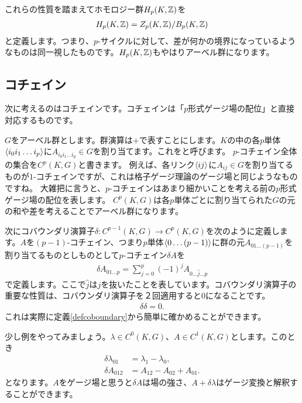 \documentclass[generalized_symmetry.tex]{subfiles}
\begin{document}
これらの性質を踏まえてホモロジー群$H_p(K,\mathbb{Z})$を
\begin{align}
    H_p(K,\mathbb{Z}) = Z_p(K,\mathbb{Z})/B_p(K,\mathbb{Z})
\end{align}
と定義します。つまり、$p$-サイクルに対して、差が何かの境界になっているようなものは同一視したものです。$H_p(K,\mathbb{Z})$もやはりアーベル群になります。

\subsection{コチェイン}

次に考えるのはコチェインです。コチェインは「$p$形式ゲージ場の配位」と直接対応するものです。

$G$をアーベル群とします。群演算は$+$で表すことにします。$K$の中の各$p$単体$\expval{i_0i_1\dots i_p}$に$A_{i_0i_1\dots i_p}\in G$を割り当てます。これをと呼びます。
$p$-コチェイン全体の集合を$C^p(K,G)$と書きます。
例えば、各リンク$\expval{ij}$に$A_{ij}\in G$を割り当てるものが$1$-コチェインですが、これは格子ゲージ理論のゲージ場と同じようなものですね。
大雑把に言うと、$p$-コチェインはあまり細かいことを考える前の$p$形式ゲージ場の配位を表します。
$C^p(K,G)$は各$p$単体ごとに割り当てられた$G$の元の和や差を考えることでアーベル群になります。

次にコバウンダリ演算子$\delta:C^{p-1}(K,G)\to C^{p}(K,G)$を次のように定義します。$A$を$(p-1)$-コチェイン、つまり$p$単体$\expval{0\dots(p-1)}$に群の元$A_{01\dots (p-1)}$を割り当てるものとしものとして$p$-コチェイン$\delta A$を
\begin{align}
    \delta A_{01\dots p} = \sum_{j=0}^{p} (-1)^{j} A_{0\dots \hat{j} \dots p}
    \label{defcoboundary}
\end{align}
で定義します。ここで$\hat{j}$は$j$を抜いたことを表しています。コバウンダリ演算子の重要な性質は、コバウンダリ演算子を２回適用すると$0$になることです。
\begin{align}
    \delta \delta = 0.
\end{align}
これは実際に定義\eqref{defcoboundary}から簡単に確かめることができます。

少し例をやってみましょう。$\lambda \in C^0(K,G)$、$A \in C^1(K,G)$とします。このとき
\begin{align}
    \delta \lambda_{01} &= \lambda_{1}-\lambda_{0},\\
    \delta A_{012} & = A_{12} - A_{02} + A_{01}.
\end{align}
となります。$A$をゲージ場と思うと$\delta A$は場の強さ、$A+\delta \lambda$はゲージ変換と解釈することができます。
\end{document}
